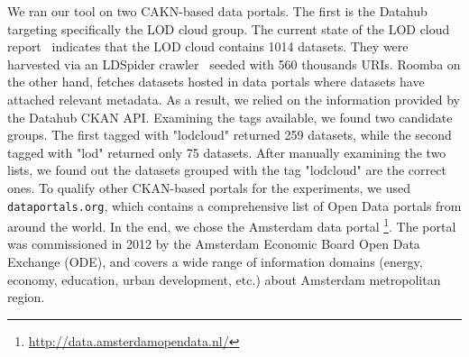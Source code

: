 \documentclass[runningheads,a4paper]{llncs}
\begin{document}
We ran our tool on two CAKN-based data portals. The first is the Datahub targeting specifically the LOD cloud group. The current state of the LOD cloud report~\cite{DBLP:conf/semweb/SchmachtenbergBP14} indicates that the LOD cloud contains 1014 datasets. They were harvested via an LDSpider crawler~\cite{conf/semweb/IseleUBH10} seeded with 560 thousands URIs. Roomba on the other hand, fetches datasets hosted in data portals where datasets have attached relevant metadata. As a result, we relied on the information provided by the Datahub CKAN API. Examining the tags available, we found two candidate groups. The first tagged with "lodcloud" returned 259 datasets, while the second tagged with "lod" returned only 75 datasets. After manually examining the two lists, we found out the datasets grouped with the tag "lodcloud" are the correct ones. To qualify other CKAN-based portals for the experiments, we used \texttt{dataportals.org}, which contains a comprehensive list of Open Data portals from around the world. In the end, we chose the Amsterdam data portal \footnote{\url{http://data.amsterdamopendata.nl/}}. The portal was commissioned in 2012 by the Amsterdam Economic Board Open Data Exchange (ODE), and covers a wide range of information domains (energy, economy, education, urban development, etc.) about Amsterdam metropolitan region.
\end{document}
